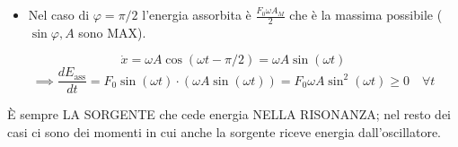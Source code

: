 \documentclass{article}
\begin{document}
\vspace{0.5cm}
\begin{itemize}
\item Nel caso di $\varphi = \pi/2$ l'energia assorbita è $\frac{F_0 \omega A_M}{2}$ che è la massima possibile ($\sin\varphi, A$ sono MAX).
\end{itemize}
\begin{equation*}
\dot{x} = \omega A \cos(\omega t - \pi/2) = \omega A \sin(\omega t)
\end{equation*}
\begin{equation*}
\implies \frac{dE_{\text{ass}}}{dt} = F_0 \sin(\omega t) \cdot (\omega A \sin(\omega t)) = F_0 \omega A \sin^2(\omega t) \ge 0 \quad \forall t
\end{equation*}

È sempre LA SORGENTE che cede energia NELLA RISONANZA; nel resto dei casi ci sono dei momenti in cui anche la sorgente riceve energia dall'oscillatore.
\end{document}

